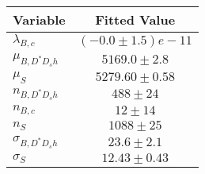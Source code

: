 \begin{tabular}[t]{lc}
\hline
Variable &Fitted Value\\
\hline\hline
$\lambda_{B,c}$&$(-0.0\pm1.5)e-11$\\
\hline
$\mu_{B, D^* D_s h}$&$5169.0\pm2.8$\\
\hline
$\mu_S$&$5279.60\pm0.58$\\
\hline
$n_{B, D^* D_s h}$&$488\pm24$\\
\hline
$n_{B,c}$&$12\pm14$\\
\hline
$n_S$&$1088\pm25$\\
\hline
$\sigma_{B, D^* D_s h}$&$23.6\pm2.1$\\
\hline
$\sigma_S$&$12.43\pm0.43$\\
\hline
\end{tabular}
